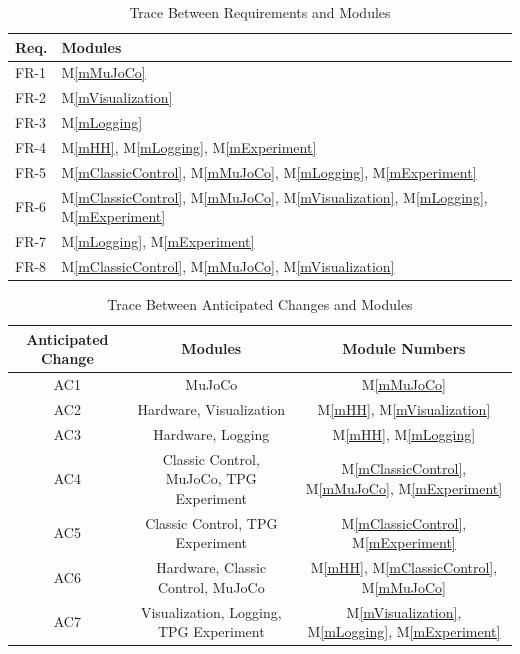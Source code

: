 \documentclass[12pt, titlepage]{article}
\newcommand{\mref}[1]{M\ref{#1}}
\begin{document}
\begin{table}[H]
\centering
\begin{tabular}{p{} p{}}
\toprule
\textbf{Req.} & \textbf{Modules}\\
\midrule
FR-1 & \mref{mMuJoCo}\\
FR-2 & \mref{mVisualization}\\
FR-3 & \mref{mLogging}\\
FR-4 & \mref{mHH}, \mref{mLogging}, \mref{mExperiment}\\
FR-5 & \mref{mClassicControl}, \mref{mMuJoCo}, \mref{mLogging}, \mref{mExperiment}\\
FR-6 & \mref{mClassicControl}, \mref{mMuJoCo}, \mref{mVisualization}, \mref{mLogging}, \mref{mExperiment}\\
FR-7 & \mref{mLogging}, \mref{mExperiment}\\
FR-8 & \mref{mClassicControl}, \mref{mMuJoCo}, \mref{mVisualization}\\
\bottomrule
\end{tabular}
\caption{Trace Between Requirements and Modules}
\label{TblRT}
\end{table}

\begin{table}[H]
  \centering
  \begin{tabular}{|c|c|c|} \hline 
  \toprule
  Anticipated Change
  & Modules & Module Numbers
  \\
  \midrule
  AC1
  & MuJoCo & \mref{mMuJoCo}
  \\
  AC2
  & Hardware, Visualization & \mref{mHH}, \mref{mVisualization}
  \\
  AC3
  & Hardware, Logging & \mref{mHH}, \mref{mLogging}
  \\
  AC4
  & Classic Control, MuJoCo, TPG Experiment  & \mref{mClassicControl}, \mref{mMuJoCo}, \mref{mExperiment}
  \\
  AC5
  & Classic Control, TPG Experiment  & \mref{mClassicControl}, \mref{mExperiment}
  \\
  AC6
  & Hardware, Classic Control, MuJoCo & \mref{mHH}, \mref{mClassicControl}, \mref{mMuJoCo}
  \\
  AC7
  & Visualization, Logging, TPG Experiment & \mref{mVisualization}, \mref{mLogging}, \mref{mExperiment}
  \\
  \bottomrule
  \end{tabular}
  \caption{Trace Between Anticipated Changes and Modules}
  \label{TblACT}
  \end{table}
\end{document}
